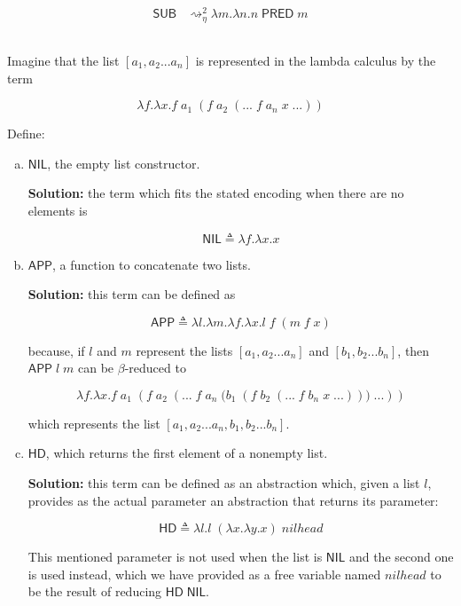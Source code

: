 \documentclass{article}
\begin{document}
\begin{align*}
  \mathsf{SUB} &\rightsquigarrow_\eta^2
    \lambda m.\lambda n.
      n\;\mathsf{PRED}\;m
\end{align*}

\subsection{}\label{ex:10}

Imagine that the list $[a_1,a_2 ...a_n]$ is represented in the 
lambda calculus by the term

$$
\lambda f.\lambda x.f\;a_1\;(f\;a_2\;(...\;f\;a_n\;x\;...))
$$

Define:

\begin{enumerate}[a)]
  \item $\mathsf{NIL}$, the empty list constructor.
  
    \textbf{Solution:} the term which fits the stated encoding 
    when there are no elements is

    $$
      \mathsf{NIL} 
        \triangleq \lambda f.\lambda x. 
          x
    $$

  \item $\mathsf{APP}$, a function to concatenate two lists.
  
    \textbf{Solution:} this term can be defined as

    $$
      \mathsf{APP} 
        \triangleq \lambda l.\lambda m.\lambda f.\lambda x. 
          l\;f\;(m\;f\;x)
    $$

    because, if $l$ and $m$ represent the lists 
    $[a_1,a_2 ...a_n]$ and $[b_1,b_2 ...b_n]$, then 
    $\mathsf{APP}\;l\;m$ can be $\beta$-reduced to 

    $$
      \lambda f.\lambda x.f\;a_1\;(f\;a_2\;(...\;f\;a_n\;\Big(
        b_1\;(f\;b_2\;(...\;f\;b_n\;x\;...))
      \Big)\;...))
    $$

    which represents the list $[a_1,a_2 ...a_n, b_1, b_2 ...b_n]$.
  \item $\mathsf{HD}$, which returns the first element of a 
    nonempty list.

    \textbf{Solution:} this term can be defined as an abstraction 
    which, given a list $l$, provides as the actual parameter 
    an abstraction that returns its parameter:

    $$
      \mathsf{HD} 
        \triangleq \lambda l.
          l\;(\lambda x.\lambda y.x)\;nilhead
    $$

    This mentioned parameter is not used when the list is 
    $\mathsf{NIL}$ and the second one is used instead, which we 
    have provided as a free variable named $nilhead$ to be the 
    result of reducing $\mathsf{HD}\;\mathsf{NIL}$.


\end{enumerate}
\end{document}
